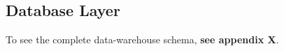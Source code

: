 \subsection{Database Layer}\label{subsec:dblayer}


To see the complete data-warehouse schema, \textbf{see appendix X}.